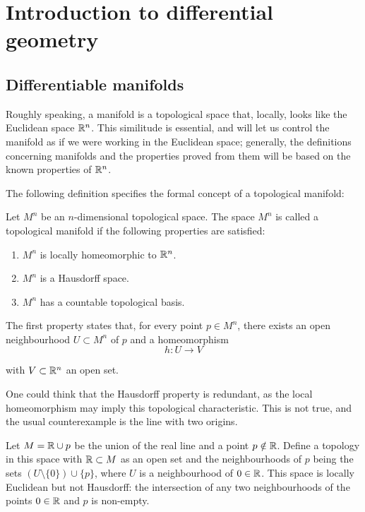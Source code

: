 \chapter{Introduction to differential geometry}

\section{Differentiable manifolds}

Roughly speaking, a manifold is a topological space that, locally, looks like the Euclidean space $\mathbb{R}^n$. This similitude is essential, and will let us control the manifold as if we were working in the Euclidean space; generally, the definitions concerning manifolds and the properties proved from them will be based on the known properties of $\mathbb{R}^n$.

The following definition specifies the formal concept of a topological manifold:

\begin{definition}
    Let $M^n$ be an $n$-dimensional topological space. The space $M^n$ is called a topological manifold if the following properties are satisfied:
    \begin{enumerate}
        \item $M^n$ is locally homeomorphic to $\mathbb{R}^n$. \label{def:manifold:homeo}
        \item $M^n$ is a Hausdorff space. \label{def:manifold:haussdorf}
        \item $M^n$ has a countable topological basis. \label{def:manifold:basis}
    \end{enumerate}
\end{definition}

The first property states that, for every point $p \in M^n$, there exists an open neighbourhood $U \subset M^n$ of $p$ and a homeomorphism
\[
    h \colon U \to V
\]

with $V \subset \mathbb{R}^n$ an open set.

One could think that the Hausdorff property is redundant, as the local homeomorphism may imply this topological characteristic. This is not true, and the usual counterexample is the line with two origins.

Let $M = \mathbb{R} \cup p$ be the union of the real line and a point $p \notin \mathbb{R}$. Define a topology in this space with $\mathbb{R} \subset M$ as an open set and the neighbourhoods of $p$ being the sets $(U \setminus \{0\}) \cup \{p\}$, where $U$ is a neighbourhood of $0 \in \mathbb{R}$. This space is locally Euclidean but not Hausdorff: the intersection of any two neighbourhoods of the points $0 \in \mathbb{R}$ and $p$ is non-empty.

